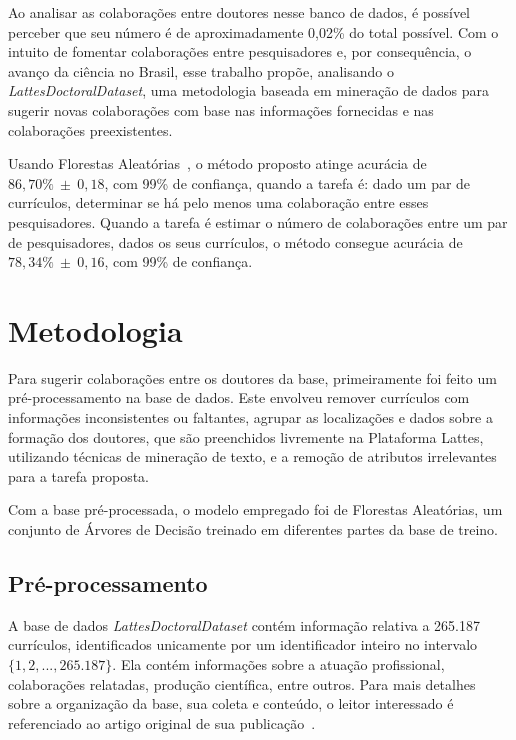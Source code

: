 \documentclass[12pt]{article}
\begin{document}
Ao analisar as colaborações entre doutores nesse banco de dados, é possível perceber que seu número é de aproximadamente 0,02\% do total possível.
Com o intuito de fomentar colaborações entre pesquisadores e, por consequência, o avanço da ciência no Brasil, esse trabalho propõe, analisando o \emph{LattesDoctoralDataset}, uma metodologia baseada em mineração de dados para sugerir novas colaborações com base nas informações fornecidas e nas colaborações preexistentes.

Usando Florestas Aleatórias~\cite{random-forests}, o método proposto atinge acurácia de $86,70\%~\pm~0,18$, com 99\% de confiança, quando a tarefa é: dado um par de currículos, determinar se há pelo menos uma colaboração entre esses pesquisadores.
Quando a tarefa é estimar o número de colaborações entre um par de pesquisadores, dados os seus currículos, o método consegue acurácia de $78,34\%~\pm~0,16$, com 99\% de confiança.

\section{Metodologia}
\label{sec:methods}

Para sugerir colaborações entre os doutores da base, primeiramente foi feito um pré-processamento na base de dados.
Este envolveu remover currículos com informações inconsistentes ou faltantes, agrupar as localizações e dados sobre a formação dos doutores, que são preenchidos livremente na Plataforma Lattes, utilizando técnicas de mineração de texto, e a remoção de atributos irrelevantes para a tarefa proposta.

Com a base pré-processada, o modelo empregado foi de Florestas Aleatórias, um conjunto de Árvores de Decisão treinado em diferentes partes da base de treino.

\subsection{Pré-processamento}
\label{sec:preprocess}

A base de dados \emph{LattesDoctoralDataset} contém informação relativa a 265.187 currículos, identificados unicamente por um identificador inteiro no intervalo $\{1, 2, ..., 265.187\}$.
Ela contém informações sobre a atuação profissional, colaborações relatadas, produção científica, entre outros.
Para mais detalhes sobre a organização da base, sua coleta e conteúdo, o leitor interessado é referenciado ao artigo original de sua publicação~\cite{lattes-dataset}.
\end{document}
